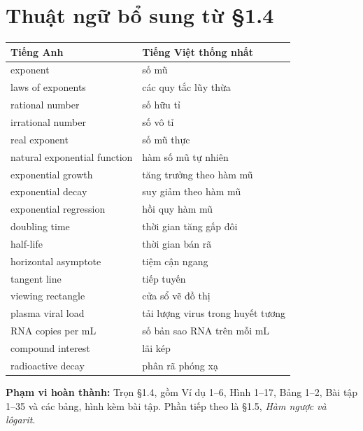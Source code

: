 \documentclass[12pt,a4paper]{article}
\begin{document}
\section*{Thuật ngữ bổ sung từ §1.4}
\begingroup\small
\begin{longtable}{p{.43\linewidth}p{.49\linewidth}}\toprule Tiếng Anh&Tiếng Việt thống nhất\\\midrule\endhead
exponent&số mũ\\
laws of exponents&các quy tắc lũy thừa\\
rational number&số hữu tỉ\\
irrational number&số vô tỉ\\
real exponent&số mũ thực\\
natural exponential function&hàm số mũ tự nhiên\\
exponential growth&tăng trưởng theo hàm mũ\\
exponential decay&suy giảm theo hàm mũ\\
exponential regression&hồi quy hàm mũ\\
doubling time&thời gian tăng gấp đôi\\
half-life&thời gian bán rã\\
horizontal asymptote&tiệm cận ngang\\
tangent line&tiếp tuyến\\
viewing rectangle&cửa sổ vẽ đồ thị\\
plasma viral load&tải lượng virus trong huyết tương\\
RNA copies per mL&số bản sao RNA trên mỗi mL\\
compound interest&lãi kép\\
radioactive decay&phân rã phóng xạ\\
\bottomrule\end{longtable}
\endgroup
\noindent\textbf{Phạm vi hoàn thành:} Trọn §1.4, gồm Ví dụ 1–6, Hình 1–17, Bảng 1–2, Bài tập 1–35 và các bảng, hình kèm bài tập. Phần tiếp theo là §1.5, \textit{Hàm ngược và lôgarit}.
\end{document}
